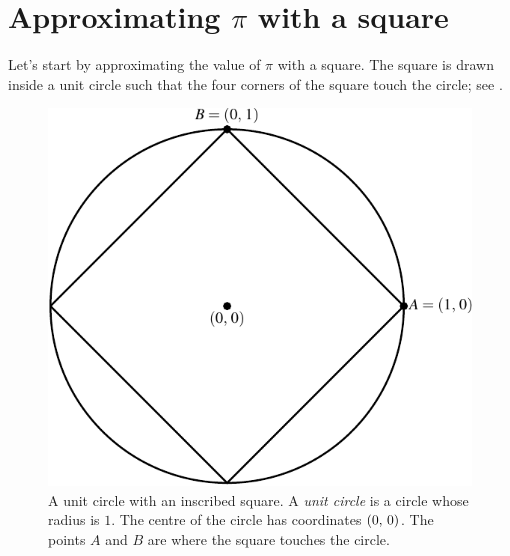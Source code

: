 \documentclass[a4paper,oneside,12pt]{article}
\begin{document}

\section{Approximating $\pi$ with a square}

Let's start by approximating the value of $\pi$ with a square.  The
square is drawn inside a unit circle such that the four corners of the
square touch the circle; see .

\begin{figure}[!htbp]
\centering
\includegraphics[scale=1]{image/03/circle-square.pdf}
\caption{%
  A unit circle with an inscribed square.  A \emph{unit circle} is a
  circle whose radius is $1$.  The centre of the circle has
  coordinates $\left\lparen{0},\, {0}\right\rparen$.  The points $A$ and $B$ are where the
  square touches the circle.
}
\label{fig:circle_inscribed_square}
\end{figure}
\end{document}

